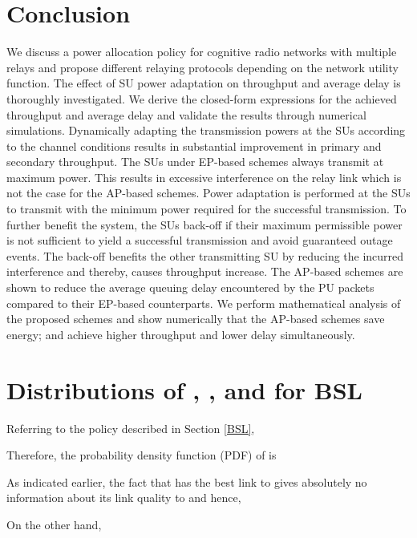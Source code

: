 \documentclass[journal,twocolumn]{IEEEtran}
\begin{document}
\section{Conclusion} \label{sect:conclusion}
We discuss a power allocation policy for cognitive radio networks with multiple relays and propose different relaying protocols depending on the network utility function. The effect of SU power adaptation on
throughput and average delay is thoroughly investigated. We derive the closed-form expressions for the achieved throughput and average delay and validate the results through numerical simulations. Dynamically adapting the transmission powers at the SUs according to the channel conditions results in substantial improvement in primary and secondary throughput. The SUs under EP-based schemes always transmit at maximum power. This results in excessive interference on the relay link which is not the case for the AP-based schemes. Power adaptation is performed at the SUs to transmit with the minimum power required for the successful
transmission. To further benefit the system, the SUs back-off if their maximum permissible power is not sufficient to yield a successful transmission and avoid guaranteed outage events. The back-off benefits the other transmitting SU by reducing the incurred interference and thereby, causes throughput increase.
The AP-based schemes are shown to reduce the average queuing delay encountered by the PU packets compared to their EP-based counterparts.
We perform mathematical analysis of the proposed schemes and show numerically that the AP-based schemes save energy; and achieve higher throughput and lower delay simultaneously.

\appendices

\section{Distributions of , , and  for BSL} \label{BSL_dist}
Referring to the policy described in Section \ref{BSL}, 

Therefore, the probability density function (PDF) of  is
     
As indicated earlier, the fact that  has the best link to  gives absolutely no information about its link quality to  and hence, 

On the other hand, 
 
\end{document}
